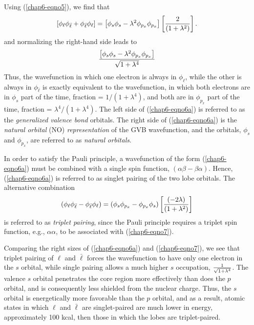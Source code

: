 Using (\ref{chap6-eqno5}), we find that
\begin{equation}
\left[ \phi_{\ell} \phi_{\bar{\ell}} + \phi_{\bar{\ell}} \phi_{\ell} 
\right] = \left[ \phi_s \phi_s - \lambda^2 \phi_{p_x} \phi_{p_x} \right] 
\left[ {2 \over (1 + \lambda^2)} \right] .
\label{chap6-eqno6a}
\end{equation}
and normalizing the right-hand side leads to
\begin{equation}
{\left[ \phi_s \phi_s - \lambda^2 \phi_{p_x} \phi_{p_x} \right] \over 
\sqrt{1+ \lambda^4}}
\label{chap6-eqno6b}
\end{equation}
Thus, the wavefunction in which one electron is always in
$\phi_{\ell}$, while the other is always in $\phi_{\bar{\ell}}$ is
exactly equivalent to the wavefunction, in which both electrons are in
$\phi_s$ part of the time, fraction = $1/(1+ \lambda^4)$, and both are
in $\phi_{p_x}$ part of the time, fraction = $\lambda^4/(1+
\lambda^4)$.  The left side of (\ref{chap6-eqno6a}) is referred to as
the \emph{generalized valence bond} orbitals.  The right side of
(\ref{chap6-eqno6a}) is the \emph{natural orbital} (NO) 
\emph{representation} of the
GVB wavefunction, and the orbitals, $\phi_s$ and
$\phi_{p_x}$, are referred to as \emph{natural orbitals}.

In order to satisfy the Pauli principle, a wavefunction of the form
(\ref{chap6-eqno6a}) must be combined with a single spin function,
$(\alpha \beta - \beta \alpha )$.  Hence, (\ref{chap6-eqno6a}) is
referred to as singlet pairing of the two lobe orbitals.  The
alternative combination
\begin{equation}
\left( \phi_{\ell} \phi_{\bar{\ell}} - \phi_{\bar{\ell}} \phi_{\ell}
\right) = \left( 
\phi_s \phi_{p_x} - \phi_{p_x} \phi_s \right) \left[ {(-2 \lambda) \over (1+ 
\lambda^2)} \right]
\label{chap6-eqno7}
\end{equation}
is referred to as \emph{triplet pairing}, since the Pauli principle
requires a triplet spin function, e.g., $\alpha \alpha$, to be
associated with (\ref{chap6-eqno7}).

Comparing the right sizes of (\ref{chap6-eqno6a}) and
(\ref{chap6-eqno7}), we see that triplet pairing of $\ell$ and
$\bar{\ell}$ forces the wavefunction to have only one electron in the
$s$ orbital, while single pairing allows a much higher $s$ occupation,
${1 \over \sqrt{1+\lambda^4}}$.
The valence $s$ orbital penetrates the core region more effectively 
than does the $p$ orbital, and is consequently less shielded from the 
nuclear charge.  Thus, the $s$ orbital is energetically more 
favorable than the $p$ orbital, and as a result, atomic states in 
which $\ell$ and $\bar{\ell}$ are singlet-paired are much lower in energy, 
approximately 100 kcal, then those in which the lobes are 
triplet-paired.

